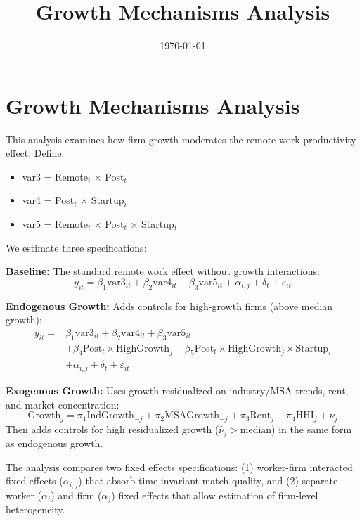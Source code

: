 \documentclass[11pt]{article}
\title{Growth Mechanisms Analysis}
\date{\today}
\begin{document}
\maketitle

\section{Growth Mechanisms Analysis}

This analysis examines how firm growth moderates the remote work productivity effect. Define:
\begin{itemize}
\item var3 = Remote$_i$ × Post$_t$
\item var4 = Post$_t$ × Startup$_i$
\item var5 = Remote$_i$ × Post$_t$ × Startup$_i$
\end{itemize}

We estimate three specifications:

\textbf{Baseline:} The standard remote work effect without growth interactions:
\begin{equation}
y_{it} = \beta_1 \text{var3}_{it} + \beta_2 \text{var4}_{it} + \beta_3 \text{var5}_{it} + \alpha_{i,j} + \delta_t + \varepsilon_{it}
\end{equation}

\textbf{Endogenous Growth:} Adds controls for high-growth firms (above median growth):
\begin{equation}
\begin{aligned}
y_{it} = &\beta_1 \text{var3}_{it} + \beta_2 \text{var4}_{it} + \beta_3 \text{var5}_{it} \\
&+ \beta_4 \text{Post}_t \times \text{HighGrowth}_j + \beta_5 \text{Post}_t \times \text{HighGrowth}_j \times \text{Startup}_i \\
&+ \alpha_{i,j} + \delta_t + \varepsilon_{it}
\end{aligned}
\end{equation}

\textbf{Exogenous Growth:} Uses growth residualized on industry/MSA trends, rent, and market concentration:
\begin{equation}
\text{Growth}_j = \pi_1 \text{IndGrowth}_{-j} + \pi_2 \text{MSAGrowth}_{-j} + \pi_3 \text{Rent}_j + \pi_4 \text{HHI}_j + \nu_j
\end{equation}
Then adds controls for high residualized growth ($\hat{\nu}_j > \text{median}$) in the same form as endogenous growth.

The analysis compares two fixed effects specifications: (1) worker-firm interacted fixed effects ($\alpha_{i,j}$) that absorb time-invariant match quality, and (2) separate worker ($\alpha_i$) and firm ($\alpha_j$) fixed effects that allow estimation of firm-level heterogeneity.
\end{document}
